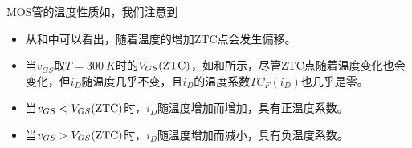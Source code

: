 MOS管的温度性质如，我们注意到
\begin{itemize}
    \item 从和中可以看出，随着温度的增加ZTC点会发生偏移。
    \item 当$v_{GS}$取$T=\SI{300}{K}$时的$V_{GS}(\text{ZTC})$，如和所示，尽管ZTC点随着温度变化也会变化，但$i_D$随温度几乎不变，且$i_D$的温度系数$TC_F(i_D)$也几乎是零。
    \item 当$v_{GS}<V_{GS}(\text{ZTC})$时，$i_D$随温度增加而增加，具有正温度系数。
    \item 当$v_{GS}>V_{GS}(\text{ZTC})$时，$i_D$随温度增加而减小，具有负温度系数。
\end{itemize}

